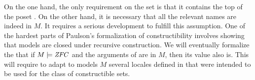 On the one hand, the only requirement on the set   is that it 
contains the top  of the poset . On the other hand, it
is necessary that all the relevant names are indeed in $M$. It
requires a serious development  to fulfill this assumption. One of the
hardest parts of Paulson's formalization of constructibility involves
showing that models are closed under recursive construction. We will
eventually formalize the that if $M\models\mathit{ZFC}$ and the arguments of
 are in $M$, then its value also is. This will require
to adapt to models $M$ several locales defined in \cite{paulson_2003}
that were intended to be used for the class of constructible sets.




